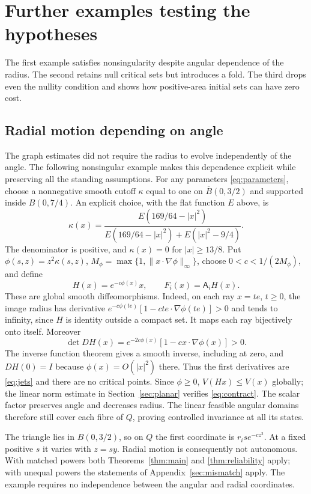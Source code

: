 \documentclass[11pt]{amsart}
\theoremstyle{definition}
\theoremstyle{remark}
\numberwithin{equation}{section}
\begin{document}
\section{Further examples testing the hypotheses}\label{app:hypotheses}
The first example satisfies nonsingularity despite angular
dependence of the radius. The second retains null critical sets
but introduces a fold. The third drops even the nullity condition
and shows how positive-area initial sets can have zero cost.

\subsection{Radial motion depending on angle}\label{sec:radialfeedback}
The graph estimates did not require the radius to evolve independently
of the angle. The following nonsingular example makes this dependence
explicit while preserving all the standing assumptions.
For any parameters \eqref{eq:parameters}, choose a nonnegative
smooth cutoff $\kappa$ equal to one on $\overline B(0,3/2)$ and
supported inside $B(0,7/4)$. An explicit choice, with the flat
function $E$ above, is
\[
\kappa(x)=\frac{E(169/64-|x|^2)}
 {E(169/64-|x|^2)+E(|x|^2-9/4)}.
\]
The denominator is positive, and $\kappa(x)=0$ for $|x|\ge13/8$.
Put $\phi(s,z)=z^2\kappa(s,z)$,
$M_\phi=\max\{1,\|x\cdot\nabla\phi\|_\infty\}$, choose
$0<c<1/(2M_\phi)$, and define
\begin{equation}\label{eq:radialfeedback}
H(x)=e^{-c\phi(x)}x,\qquad F_i(x)=\mathsf A_iH(x).
\end{equation}
These are global smooth diffeomorphisms. Indeed, on each ray
$x=te$, $t\ge0$, the image radius has derivative
$e^{-c\phi(te)}[1-cte\cdot\nabla\phi(te)]>0$ and tends to
infinity, since $H$ is identity outside a compact set. It maps
each ray bijectively onto itself. Moreover
\[
\det DH(x)=e^{-2c\phi(x)}[1-cx\cdot\nabla\phi(x)]>0.
\]
The inverse function theorem gives a smooth inverse, including
at zero, and $DH(0)=I$ because $\phi(x)=O(|x|^2)$ there.
Thus the first derivatives are \eqref{eq:jets} and there are no
critical points. Since $\phi\ge0$, $V(Hx)\le V(x)$ globally;
the linear norm estimate in Section~\ref{sec:planar} verifies
\eqref{eq:contract}. The scalar factor preserves angle and decreases
radius. The linear feasible angular domains therefore still cover
each fibre of $Q$, proving controlled invariance at all its states.

The triangle lies in $B(0,3/2)$, so on $Q$ the first coordinate
is $r_i s e^{-cz^2}$. At a fixed positive $s$ it varies with
$z=sy$. Radial motion is consequently not autonomous. With
matched powers both Theorems~\ref{thm:main} and
\ref{thm:reliability} apply; with unequal powers the statements
of Appendix~\ref{sec:mismatch} apply. The example requires no independence between the angular and radial
coordinates.
\end{document}
